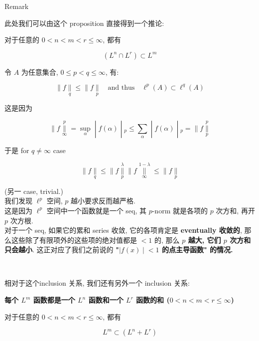 \documentclass{qlnotes-export}
\begin{document}
\begin{qlremark}{Remark}

此处我们可以由这个 proposition 直接得到一个推论: ~

\begin{corollary}

对于任意的 \(0 < n < m < r \leq \infty\), 都有

\[(L^{n} \cap L^{r}) \subset L^{m}\]

\end{corollary}

\end{qlremark}

\begin{example}

令 \(A\) 为任意集合, \(0 \leq p < q \leq \infty\), 有:

\[\parallel f\underset{q}{\parallel} \leq \parallel f\underset{p}{\parallel}\quad\text{and thus}\quad\ell^{p}(A) \subset \ell^{q}(A)\]

这是因为

\[\left. \parallel f\underset{\infty}{\overset{p}{\parallel}} = \sup\limits_{\alpha} \middle| f(\alpha) \middle| {}_{p} \leq \sum\limits_{\alpha} \middle| f(\alpha) \middle| {}_{p} = \parallel f\underset{p}{\overset{p}{\parallel}} \right.\]

于是 for \(q \neq \infty\) case

\[\parallel f\underset{q}{\parallel} \leq \parallel f\underset{p}{\overset{\lambda}{\parallel}} \parallel f\underset{\infty}{\overset{1 - \lambda}{\parallel}} \leq \parallel f\underset{p}{\parallel}\]

(另一 case, trivial.)\\
我们发现 \(\ell^{p}\) 空间, \(p\) 越小要求反而越严格.\\
这是因为 \(\ell^{p}\) 空间中一个函数就是一个 seq, 其 \(p\)-norm 就是各项的 \(p\) 次方和, 再开 \(p\) 次方根.\\
对于一个 seq, 如果它的累和 series 收敛, 它的各项肯定是 \textbf{eventually 收敛的}, 那么这些除了有限项外的这些项的绝对值都是 \(< 1\) 的, 那么 \textbf{\(p\) 越大, 它们 \(p\) 次方和只会越小}. 这正对应了我们之前说的 \textbf{"\(\left. |f(x) \middle| < 1 \right.\) 的点主导函数" 的情况.}\\
\strut \\

\end{example}

相对于这个inclusion 关系, 我们还有另外一个 inclusion 关系:

\begin{proposition}{\protect{}\label{kn-l-m-l-n-l-r-0-n-m-r-leq-infty}{\textbf{每个
\(L^{m}\) 函数都是一个 \(L^{n}\) 函数和一个 \(L^{r}\) 函数的和
(\(0 < n < m < r \leq \infty\))}}}

对于任意的 \(0 < n < m < r \leq \infty\), 都有

\[L^{m} \subset (L^{n} + L^{r})\]

\end{proposition}
\end{document}
